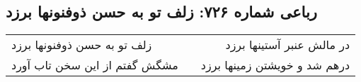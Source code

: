 \begin{center}
\section*{رباعی شماره ۷۲۶: زلف تو به حسن ذوفنونها برزد}
\label{sec:0726}
\begin{longtable}{l p{0.5cm} r}
زلف تو به حسن ذوفنونها برزد
&&
در مالش عنبر آستینها برزد
\\
مشگش گفتم از این سخن تاب آورد
&&
درهم شد و خویشتن زمینها برزد
\\
\end{longtable}
\end{center}
